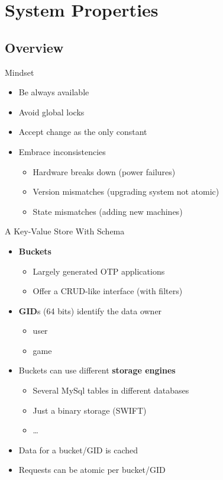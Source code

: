 \documentclass[aspectratio=169]{beamer}
\begin{document}
\section{System Properties}

\subsection{Overview}

\begin{frame}{Mindset}
    \begin{itemize}
        \item Be always available
        \item Avoid global locks
        \item Accept change as the only constant
        \item Embrace inconsistencies
            \begin{itemize}
                \item Hardware breaks down (power failures)
                \item Version mismatches (upgrading system not atomic)
                \item State mismatches (adding new machines)
            \end{itemize}
    \end{itemize}
\end{frame}

\begin{frame}{A Key-Value Store With Schema}
    \begin{itemize}
        \item \textbf{Buckets}
            \begin{itemize}
                \item Largely generated OTP applications
                \item Offer a CRUD-like interface (with filters)
            \end{itemize}
        \item \textbf{GID}s (64 bits) identify the data owner
            \begin{itemize}
                \item user
                \item game
            \end{itemize}
        \item Buckets can use different \textbf{storage engines}
            \begin{itemize}
                \item Several MySql tables in different databases
                \item Just a binary storage (SWIFT)
                \item \dots
            \end{itemize}
        \item Data for a bucket/GID is cached
        \item Requests can be atomic per bucket/GID
    \end{itemize}
\end{frame}
\end{document}
